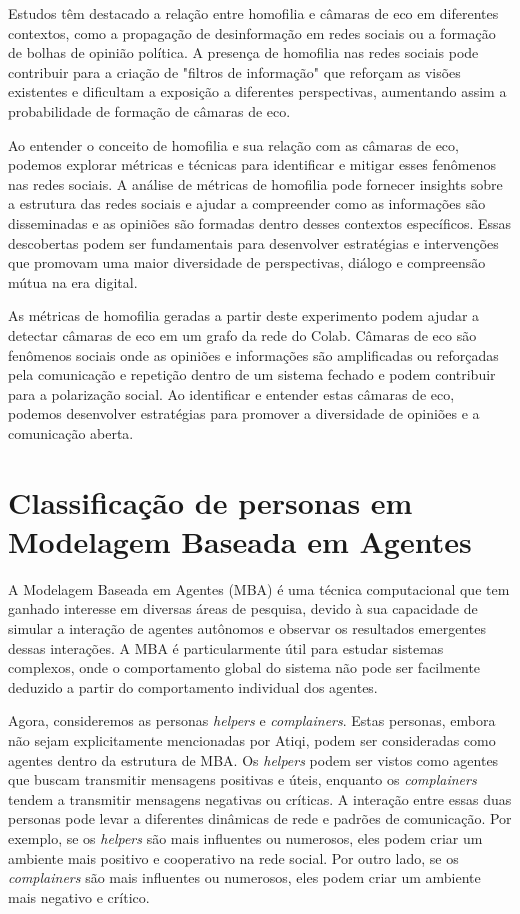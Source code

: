 Estudos têm destacado a relação entre homofilia e câmaras de eco em diferentes contextos, como a propagação de desinformação em redes sociais ou a formação de bolhas de opinião política. A presença de homofilia nas redes sociais pode contribuir para a criação de "filtros de informação" que reforçam as visões existentes e dificultam a exposição a diferentes perspectivas, aumentando assim a probabilidade de formação de câmaras de eco.

Ao entender o conceito de homofilia e sua relação com as câmaras de eco, podemos explorar métricas e técnicas para identificar e mitigar esses fenômenos nas redes sociais. A análise de métricas de homofilia pode fornecer insights sobre a estrutura das redes sociais e ajudar a compreender como as informações são disseminadas e as opiniões são formadas dentro desses contextos específicos. Essas descobertas podem ser fundamentais para desenvolver estratégias e intervenções que promovam uma maior diversidade de perspectivas, diálogo e compreensão mútua na era digital.

As métricas de homofilia geradas a partir deste experimento podem ajudar a detectar câmaras de eco em um grafo da rede do Colab. Câmaras de eco são fenômenos sociais onde as opiniões e informações são amplificadas ou reforçadas pela comunicação e repetição dentro de um sistema fechado e podem contribuir para a polarização social. Ao identificar e entender estas câmaras de eco, podemos desenvolver estratégias para promover a diversidade de opiniões e a comunicação aberta.

\section{Classificação de personas em Modelagem Baseada em Agentes}

A Modelagem Baseada em Agentes (MBA) é uma técnica computacional que tem ganhado interesse em diversas áreas de pesquisa, devido à sua capacidade de simular a interação de agentes autônomos e observar os resultados emergentes dessas interações. A MBA é particularmente útil para estudar sistemas complexos, onde o comportamento global do sistema não pode ser facilmente deduzido a partir do comportamento individual dos agentes.

Agora, consideremos as personas \textit{helpers} e \textit{complainers}. Estas personas, embora não sejam explicitamente mencionadas por Atiqi, podem ser consideradas como agentes dentro da estrutura de MBA. Os \textit{helpers} podem ser vistos como agentes que buscam transmitir mensagens positivas e úteis, enquanto os \textit{complainers} tendem a transmitir mensagens negativas ou críticas. A interação entre essas duas personas pode levar a diferentes dinâmicas de rede e padrões de comunicação. Por exemplo, se os \textit{helpers} são mais influentes ou numerosos, eles podem criar um ambiente mais positivo e cooperativo na rede social. Por outro lado, se os \textit{complainers} são mais influentes ou numerosos, eles podem criar um ambiente mais negativo e crítico. 

